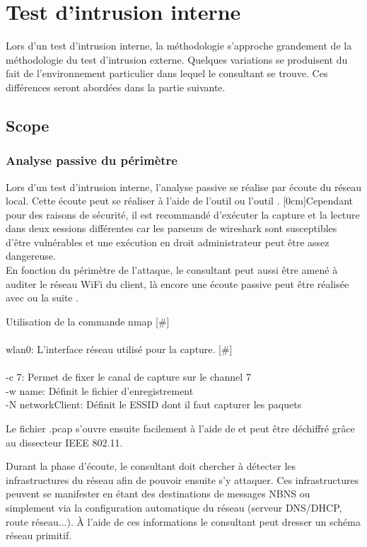 \documentclass[twoside,a4paper,12pt,titlepage]{book}
\newcommand{\MarginPar}[2]{\marginnote{\scriptsize #1}[#2]}
\begin{document}
\section{Test d'intrusion interne}
	Lors d'un test d'intrusion interne, la méthodologie s'approche grandement de la méthodologie du test d'intrusion externe. Quelques variations se produisent du fait de l'environnement particulier dans lequel le consultant se trouve. Ces différences seront abordées dans la partie suivante.
\subsection{Scope}
\subsubsection{Analyse passive du périmètre}
Lors d'un test d'intrusion interne, l'analyse passive se réalise par écoute du réseau local. Cette écoute peut se réaliser à l'aide de l'outil  ou l'outil . \MarginPar{\textbf{Capture réseau}}{0cm}Cependant pour des raisons de sécurité, il est recommandé d'exécuter la capture et la lecture dans deux sessions différentes car les parseurs de wireshark sont susceptibles d'être vulnérables et une exécution en droit administrateur peut être assez dangereuse.\\
	En fonction du périmètre de l'attaque, le consultant peut aussi être amené à auditer le réseau WiFi du client, là encore une écoute passive peut être réalisée avec  ou la suite .
\begin{FlagConsole}{Utilisation de la commande nmap}
	[\#]\\
	 \\
	wlan0: L'interface réseau utilisé pour la capture.
	\tcblower
	[\#]\\
	 \\
	-c 7: Permet de fixer le canal de capture sur le channel 7\\
	-w name: Définit le fichier d'enregistrement\\
	-N networkClient: Définit le ESSID dont il faut capturer les paquets\\
\end{FlagConsole}
	Le fichier .pcap s'ouvre ensuite facilement à l'aide de  et peut être déchiffré grâce au dissecteur IEEE 802.11.

	Durant la phase d'écoute, le consultant doit chercher à détecter les infrastructures du réseau afin de pouvoir ensuite s'y attaquer. Ces infrastructures peuvent se manifester en étant des destinations de messages NBNS ou simplement via la configuration automatique du réseau (serveur DNS/DHCP, route réseau...). À l'aide de ces informations le consultant peut dresser un schéma réseau primitif.
\end{document}
